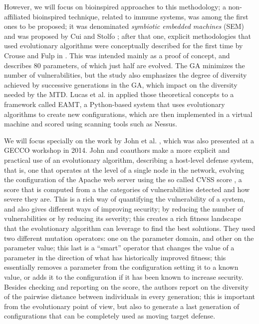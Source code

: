 \documentclass[sigconf]{acmart}
\begin{document}
However, we will focus on bioinspired approaches to this methodology; a non-affiliated
bioinspired technique, related to immune systems, was among the first
ones to be proposed; it was denominated  {\em symbiotic embedded
  machines} (SEM) and was proposed by Cui and Stolfo
\cite{cui2011symbiotes}; after that one, explicit
methodologies that used evolutionary algorithms were conceptually described for the first
time by Crouse and Fulp in \cite{6111663}. This was intended mainly as
a proof of concept, and describes 80 parameters, of which just half
are evolved. The GA minimizes the number of vulnerabilities, but the
study also emphasizes the degree of diversity achieved by successive
generations in the GA, which impact on the diversity needed by the
MTD. Lucas et al. in \cite{lucas2014initial} applied those theoretical
concepts to a framework called EAMT, a Python-based system that uses
evolutionary algorithms to create new configurations, which are then
implemented in a virtual machine and scored using scanning tools such
as Nessus.

We will focus specially on the work by John et
al. \cite{john_evolutionary_2014}, which was also presented at a GECCO
workshop in 2014. John and coauthors make a more explicit and practical
use of an evolutionary algorithm, describing a host-level
defense system, that is, one that operates at the level of a single
node in the network, evolving the configuration of the Apache web
server using the so called CVSS score \cite{cvss}, a score that is computed from a
the categories of vulnerabilities detected and how severe they
are. This is a rich way of quantifying the vulnerability of a system,
and also gives different ways of improving security; by reducing the
number of vulnerabilities or by reducing its severity; this creates a
rich fitness landscape that the evolutionary algorithm can leverage to
find the best solutions. They used two different mutation operators:
one on the parameter domain, and other on the parameter value; this
last is a ``smart'' operator that changes the value of a parameter in
the direction of what has historically improved fitness; this
essentially removes a parameter from the configuration setting it to a
known value, or adds it to the configuration if it has been known to
increase security. Besides checking and reporting on the score, the
authors report on the diversity of the pairwise distance between
individuals in every generation; this is important from the
evolutionary point of view, but also to generate a last generation of
configurations that can be completely used as moving target defense.
\end{document}
